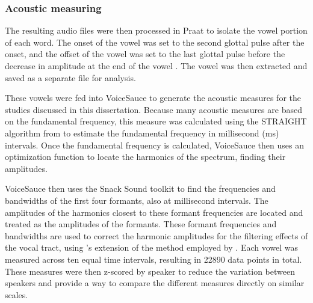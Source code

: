\subsubsection{Acoustic measuring} \label{sec:acoustics}

The resulting audio files were then processed in Praat to isolate the vowel portion of each word. The onset of the vowel was set to the second glottal pulse after the onset, and the offset of the vowel was set to the last glottal pulse before the decrease in amplitude at the end of the vowel \citep{garellekAcousticDiscriminabilityComplex2020}. The vowel was then extracted and saved as a separate file for analysis.

These vowels were fed into VoiceSauce \citep{shueVoiceSauceProgramVoice2011} to generate the acoustic measures for the studies discussed in this dissertation. Because many acoustic measures are based on the fundamental frequency, this measure was calculated using the STRAIGHT algorithm from \citep{kawaharaInstantaneousfrequencybasedPitchExtraction1998} to estimate the fundamental frequency in millisecond (ms) intervals. Once the fundamental frequency is calculated, VoiceSauce then uses an optimization function to locate the harmonics of the spectrum, finding their amplitudes.

VoiceSauce then uses the Snack Sound toolkit \citep{sjolanderSnackSoundToolkit2004} to find the frequencies and bandwidths of the first four formants, also at millisecond intervals. The amplitudes of the harmonics closest to these formant frequencies are located and treated as the amplitudes of the formants. These formant frequencies and bandwidths are used to correct the harmonic amplitudes for the filtering effects of the vocal tract, using \citeauthor{iseliAgeSexVowel2007}'s \citeyear{iseliAgeSexVowel2007} extension of the method employed by \citet{hansonGlottalCharacteristicsFemale1997}. Each vowel was measured across ten equal time intervals, resulting in 22890 data points in total. These measures were then z-scored by speaker to reduce the variation between speakers and provide a way to compare the different measures directly on similar scales.


